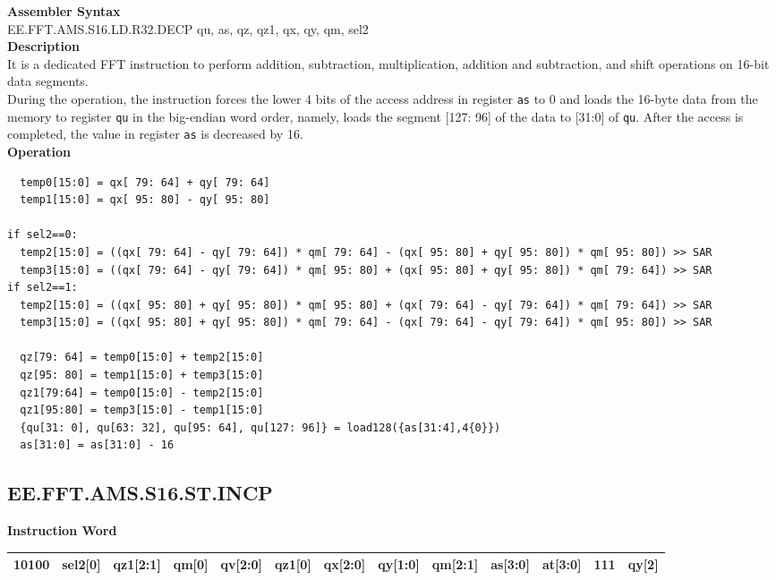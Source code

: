 \textbf{Assembler Syntax} \\
EE.FFT.AMS.S16.LD.R32.DECP qu, as, qz, qz1, qx, qy, qm, sel2 \\
\textbf{Description} \\
It is a dedicated FFT instruction to perform addition, subtraction, multiplication, addition and subtraction, and shift operations on 16-bit data segments.\\
During the operation, the instruction forces the lower 4 bits of the access address in register \lstinline{as} to 0 and loads the 16-byte data from the memory to register \lstinline{qu} in the big-endian word order, namely, loads the segment [127: 96] of the data to [31:0] of \lstinline{qu}. After the access is completed, the value in register \lstinline{as} is decreased by 16.\\
\textbf{Operation}
\begin{lstlisting}
  temp0[15:0] = qx[ 79: 64] + qy[ 79: 64]
  temp1[15:0] = qx[ 95: 80] - qy[ 95: 80]

if sel2==0:
  temp2[15:0] = ((qx[ 79: 64] - qy[ 79: 64]) * qm[ 79: 64] - (qx[ 95: 80] + qy[ 95: 80]) * qm[ 95: 80]) >> SAR
  temp3[15:0] = ((qx[ 79: 64] - qy[ 79: 64]) * qm[ 95: 80] + (qx[ 95: 80] + qy[ 95: 80]) * qm[ 79: 64]) >> SAR
if sel2==1:
  temp2[15:0] = ((qx[ 95: 80] + qy[ 95: 80]) * qm[ 95: 80] + (qx[ 79: 64] - qy[ 79: 64]) * qm[ 79: 64]) >> SAR
  temp3[15:0] = ((qx[ 95: 80] + qy[ 95: 80]) * qm[ 79: 64] - (qx[ 79: 64] - qy[ 79: 64]) * qm[ 95: 80]) >> SAR

  qz[79: 64] = temp0[15:0] + temp2[15:0]
  qz[95: 80] = temp1[15:0] + temp3[15:0]
  qz1[79:64] = temp0[15:0] - temp2[15:0]
  qz1[95:80] = temp3[15:0] - temp1[15:0]
  {qu[31: 0], qu[63: 32], qu[95: 64], qu[127: 96]} = load128({as[31:4],4{0}})
  as[31:0] = as[31:0] - 16
\end{lstlisting}

\clearpage
\subsection{EE.FFT.AMS.S16.ST.INCP}\label{instruction:EEFFTAMSS16STINCP}
\setlength\tabcolsep{6pt}
\textbf{Instruction Word} \\
\begin{tabular}{|c|c|c|c|c|c|c|c|c|c|c|c|c|}
	\hline
	10100 & sel2[0] & qz1[2:1] & qm[0] & qv[2:0] & qz1[0] & qx[2:0] & qy[1:0] & qm[2:1] & as[3:0] & at[3:0] & 111 & qy[2] \\
	\hline
\end{tabular}

